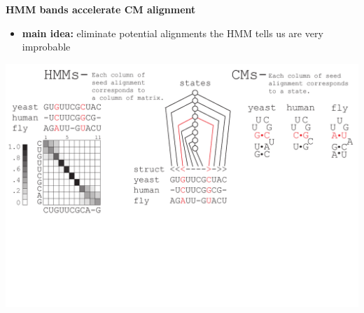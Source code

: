 \documentclass[landscape]{slides}
\begin{document}
\begin{slide}
\begin{center}

\textbf{HMM bands accelerate CM alignment}
\end{center}
\medskip
\small
\begin{itemize}
\item
\textbf{main idea:} eliminate potential alignments the HMM tells us are very improbable
\end{itemize}
\begin{center}
\includegraphics[width=8in]{figs/post_hmm_to_cm_map2_layer10}
\end{center}
\vfill
\end{slide}
\end{document}
